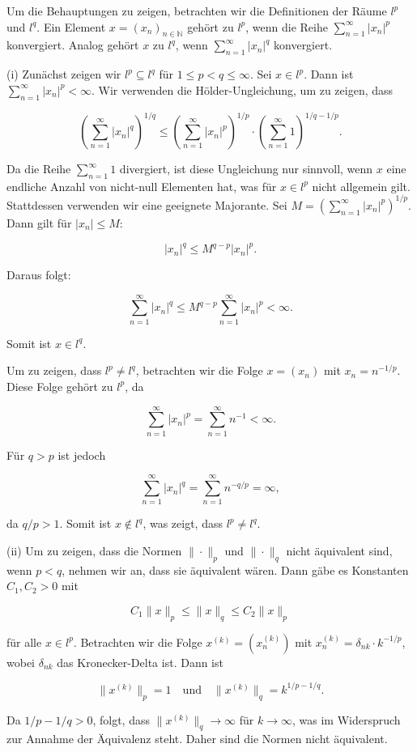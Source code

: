 Um die Behauptungen zu zeigen, betrachten wir die Definitionen der Räume \( l^p \) und \( l^q \). Ein Element \( x = (x_n)_{n \in \mathbb{N}} \) gehört zu \( l^p \), wenn die Reihe \( \sum_{n=1}^{\infty} |x_n|^p \) konvergiert. Analog gehört \( x \) zu \( l^q \), wenn \( \sum_{n=1}^{\infty} |x_n|^q \) konvergiert.

(i) Zunächst zeigen wir \( l^p \subseteq l^q \) für \( 1 \leq p < q \leq \infty \). Sei \( x \in l^p \). Dann ist \( \sum_{n=1}^{\infty} |x_n|^p < \infty \). Wir verwenden die Hölder-Ungleichung, um zu zeigen, dass

\[
\left( \sum_{n=1}^{\infty} |x_n|^q \right)^{1/q} \leq \left( \sum_{n=1}^{\infty} |x_n|^p \right)^{1/p} \cdot \left( \sum_{n=1}^{\infty} 1 \right)^{1/q - 1/p}.
\]

Da die Reihe \( \sum_{n=1}^{\infty} 1 \) divergiert, ist diese Ungleichung nur sinnvoll, wenn \( x \) eine endliche Anzahl von nicht-null Elementen hat, was für \( x \in l^p \) nicht allgemein gilt. Stattdessen verwenden wir eine geeignete Majorante. Sei \( M = \left( \sum_{n=1}^{\infty} |x_n|^p \right)^{1/p} \). Dann gilt für \( |x_n| \leq M \):

\[
|x_n|^q \leq M^{q-p} |x_n|^p.
\]

Daraus folgt:

\[
\sum_{n=1}^{\infty} |x_n|^q \leq M^{q-p} \sum_{n=1}^{\infty} |x_n|^p < \infty.
\]

Somit ist \( x \in l^q \).

Um zu zeigen, dass \( l^p \neq l^q \), betrachten wir die Folge \( x = (x_n) \) mit \( x_n = n^{-1/p} \). Diese Folge gehört zu \( l^p \), da

\[
\sum_{n=1}^{\infty} |x_n|^p = \sum_{n=1}^{\infty} n^{-1} < \infty.
\]

Für \( q > p \) ist jedoch

\[
\sum_{n=1}^{\infty} |x_n|^q = \sum_{n=1}^{\infty} n^{-q/p} = \infty,
\]

da \( q/p > 1 \). Somit ist \( x \notin l^q \), was zeigt, dass \( l^p \neq l^q \).

(ii) Um zu zeigen, dass die Normen \( \|\cdot\|_p \) und \( \|\cdot\|_q \) nicht äquivalent sind, wenn \( p < q \), nehmen wir an, dass sie äquivalent wären. Dann gäbe es Konstanten \( C_1, C_2 > 0 \) mit

\[
C_1 \|x\|_p \leq \|x\|_q \leq C_2 \|x\|_p
\]

für alle \( x \in l^p \). Betrachten wir die Folge \( x^{(k)} = (x_n^{(k)}) \) mit \( x_n^{(k)} = \delta_{nk} \cdot k^{-1/p} \), wobei \( \delta_{nk} \) das Kronecker-Delta ist. Dann ist

\[
\|x^{(k)}\|_p = 1 \quad \text{und} \quad \|x^{(k)}\|_q = k^{1/p - 1/q}.
\]

Da \( 1/p - 1/q > 0 \), folgt, dass \( \|x^{(k)}\|_q \to \infty \) für \( k \to \infty \), was im Widerspruch zur Annahme der Äquivalenz steht. Daher sind die Normen nicht äquivalent.

